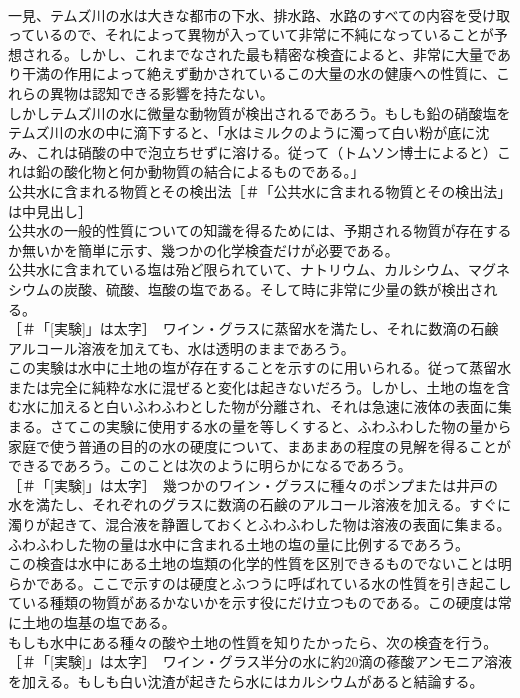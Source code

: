 \documentclass[8pt]{extreport}
\begin{document}
\begin{CJK}{UTF8}{min}
\\	一見、テムズ川の水は大きな都市の下水、排水路、水路のすべての内容を受け取っているので、それによって異物が入っていて非常に不純になっていることが予想される。しかし、これまでなされた最も精密な検査によると、非常に大量であり干満の作用によって絶えず動かされているこの大量の水の健康への性質に、これらの異物は認知できる影響を持たない。
\\	しかしテムズ川の水に微量な動物質が検出されるであろう。もしも鉛の硝酸塩をテムズ川の水の中に滴下すると、「水はミルクのように濁って白い粉が底に沈み、これは硝酸の中で泡立ちせずに溶ける。従って（トムソン博士によると）これは鉛の酸化物と何か動物質の結合によるものである。」
\\	公共水に含まれる物質とその検出法［＃「公共水に含まれる物質とその検出法」は中見出し］
\\	公共水の一般的性質についての知識を得るためには、予期される物質が存在するか無いかを簡単に示す、幾つかの化学検査だけが必要である。
\\	公共水に含まれている塩は殆ど限られていて、ナトリウム、カルシウム、マグネシウムの炭酸、硫酸、塩酸の塩である。そして時に非常に少量の鉄が検出される。
\\	[実験]［＃「[実験]」は太字］　ワイン・グラスに蒸留水を満たし、それに数滴の石鹸アルコール溶液を加えても、水は透明のままであろう。
\\	この実験は水中に土地の塩が存在することを示すのに用いられる。従って蒸留水または完全に純粋な水に混ぜると変化は起きないだろう。しかし、土地の塩を含む水に加えると白いふわふわとした物が分離され、それは急速に液体の表面に集まる。さてこの実験に使用する水の量を等しくすると、ふわふわした物の量から家庭で使う普通の目的の水の硬度について、まあまあの程度の見解を得ることができるであろう。このことは次のように明らかになるであろう。
\\	[実験]［＃「[実験]」は太字］　幾つかのワイン・グラスに種々のポンプまたは井戸の水を満たし、それぞれのグラスに数滴の石鹸のアルコール溶液を加える。すぐに濁りが起きて、混合液を静置しておくとふわふわした物は溶液の表面に集まる。ふわふわした物の量は水中に含まれる土地の塩の量に比例するであろう。
\\	この検査は水中にある土地の塩類の化学的性質を区別できるものでないことは明らかである。ここで示すのは硬度とふつうに呼ばれている水の性質を引き起こしている種類の物質があるかないかを示す役にだけ立つものである。この硬度は常に土地の塩基の塩である。
\\	もしも水中にある種々の酸や土地の性質を知りたかったら、次の検査を行う。
\\	[実験]［＃「[実験]」は太字］　ワイン・グラス半分の水に約20滴の蓚酸アンモニア溶液を加える。もしも白い沈渣が起きたら水にはカルシウムがあると結論する。

\end{CJK}
\end{document}
